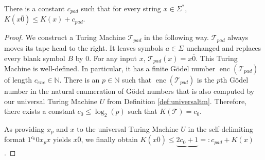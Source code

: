 \begin{lemma}
	\label{lemma:additional-complexity-zero-pad}
	There is a constant $c_{pad}$ such that for every string $x\in\Sigma^{*}$, $K(x\overline{0})\leq K(x)+c_{pad}$.
\end{lemma}
\begin{proof}
	We construct a Turing Machine $\mathcal{T}_{pad}$ in the following way.
	$\mathcal{T}_{pad}$ always moves its tape head to the right. 
	It leaves symbols $a\in\Sigma$ unchanged and replaces every blank symbol $B$ by $0$.
	For any input $x$, $\mathcal{T}_{pad}(x)=x\overline{0}$.
	This Turing Machine is well-defined. In particular, it has a finite G\"odel number $\operatorname{enc}(\mathcal{T}_{pad})$ of length $c_{enc}\in\mathbb{N}$.
	There is an $p\in\mathbb{N}$ such that $\operatorname{enc}(\mathcal{T}_{pad})$ is the $p$th G\"odel number in the natural enumeration of G\"odel numbers that is also computed by our universal Turing Machine $U$ from Definition \ref{def:universaltm}. 
	Therefore, there exists a constant $c_0\leq\log_2(p)$ such that $K(\mathcal{T})=c_0$.
	
	As providing $x_p$ and $x$ to the universal Turing Machine $U$ in the self-delimiting format $1^{c_{0}} 0 x_p x$ yields $x\overline{0}$, we finally obtain $K(x\overline{0})\leq \underbrace{2c_0+1}{=:c_{pad}}+K(x)$.
\end{proof}

%
%
%
%
%
%
%
%
